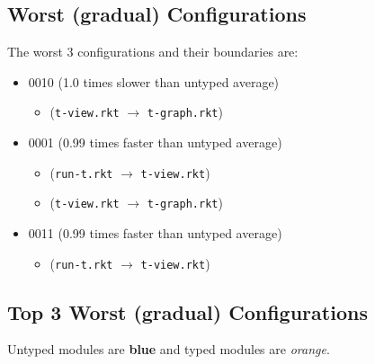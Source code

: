 \documentclass{article}
\newcommand{\mono}[1]{\texttt{#1}}
\begin{document}
\subsection{Worst (gradual) Configurations}
The worst 3 configurations and their boundaries are:
\begin{itemize}
\item 0010 (1.0 times slower than untyped average)
  \begin{itemize}
  \item (\mono{t-view.rkt} $\rightarrow$ \mono{t-graph.rkt})
  \end{itemize}
\item 0001 (0.99 times faster than untyped average)
  \begin{itemize}
  \item (\mono{run-t.rkt} $\rightarrow$ \mono{t-view.rkt})
  \item (\mono{t-view.rkt} $\rightarrow$ \mono{t-graph.rkt})
  \end{itemize}
\item 0011 (0.99 times faster than untyped average)
  \begin{itemize}
  \item (\mono{run-t.rkt} $\rightarrow$ \mono{t-view.rkt})
  \end{itemize}
\end{itemize}

\subsection{Top 3 Worst (gradual) Configurations}
Untyped modules are \textbf{blue} and typed modules are \emph{orange}.
\end{document}
